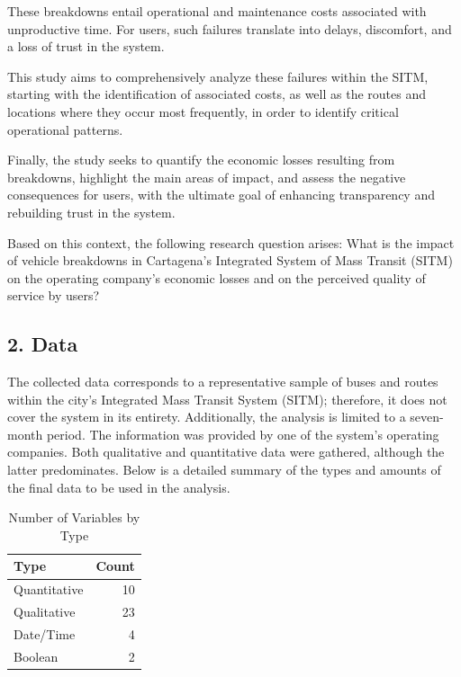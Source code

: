 \documentclass[
  letterpaper,
  DIV=11,
  numbers=noendperiod]{scrartcl}
\begin{document}
These breakdowns entail operational and maintenance costs associated
with unproductive time. For users, such failures translate into delays,
discomfort, and a loss of trust in the system.

This study aims to comprehensively analyze these failures within the
SITM, starting with the identification of associated costs, as well as
the routes and locations where they occur most frequently, in order to
identify critical operational patterns.

Finally, the study seeks to quantify the economic losses resulting from
breakdowns, highlight the main areas of impact, and assess the negative
consequences for users, with the ultimate goal of enhancing transparency
and rebuilding trust in the system.

Based on this context, the following research question arises: What is
the impact of vehicle breakdowns in Cartagena's Integrated System of
Mass Transit (SITM) on the operating company's economic losses and on
the perceived quality of service by users?

\subsection{2. Data}\label{data}

The collected data corresponds to a representative sample of buses and
routes within the city's Integrated Mass Transit System (SITM);
therefore, it does not cover the system in its entirety. Additionally,
the analysis is limited to a seven-month period. The information was
provided by one of the system's operating companies. Both qualitative
and quantitative data were gathered, although the latter predominates.
Below is a detailed summary of the types and amounts of the final data
to be used in the analysis.

\begin{table}[H]
\centering
\caption{Number of Variables by Type}
\centering
\begin{tabular}[t]{l|r}
\hline
Type & Count\\
\hline
Quantitative & 10\\
\hline
Qualitative & 23\\
\hline
Date/Time & 4\\
\hline
Boolean & 2\\
\hline
\end{tabular}
\end{table}
\end{document}
